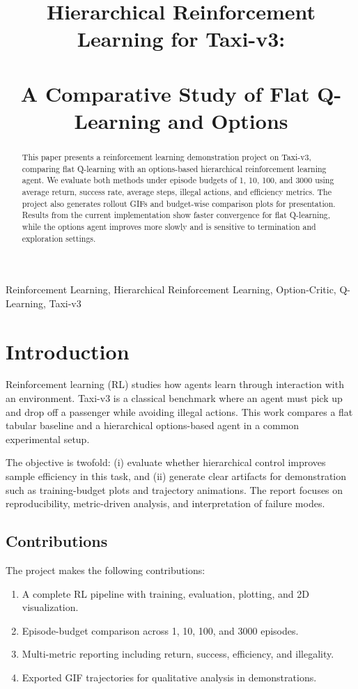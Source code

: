\documentclass[conference]{IEEEtran}
\title{Hierarchical Reinforcement Learning for Taxi-v3: \\\\ A Comparative Study of Flat Q-Learning and Options}
\author{\IEEEauthorblockN{Ravi Jangid}
\IEEEauthorblockA{Registration No.: 22MIC7020\\
Department of CSE\\
VIT-AP University}}
\begin{document}
\maketitle

\begin{abstract}
This paper presents a reinforcement learning demonstration project on Taxi-v3, comparing flat Q-learning with an options-based hierarchical reinforcement learning agent. We evaluate both methods under episode budgets of 1, 10, 100, and 3000 using average return, success rate, average steps, illegal actions, and efficiency metrics. The project also generates rollout GIFs and budget-wise comparison plots for presentation. Results from the current implementation show faster convergence for flat Q-learning, while the options agent improves more slowly and is sensitive to termination and exploration settings.
\end{abstract}

\begin{IEEEkeywords}
Reinforcement Learning, Hierarchical Reinforcement Learning, Option-Critic, Q-Learning, Taxi-v3
\end{IEEEkeywords}

\section{Introduction}
Reinforcement learning (RL) studies how agents learn through interaction with an environment. Taxi-v3 is a classical benchmark where an agent must pick up and drop off a passenger while avoiding illegal actions. This work compares a flat tabular baseline and a hierarchical options-based agent in a common experimental setup.

The objective is twofold: (i) evaluate whether hierarchical control improves sample efficiency in this task, and (ii) generate clear artifacts for demonstration such as training-budget plots and trajectory animations. The report focuses on reproducibility, metric-driven analysis, and interpretation of failure modes.

\subsection{Contributions}
The project makes the following contributions:
\begin{enumerate}
\item A complete RL pipeline with training, evaluation, plotting, and 2D visualization.
\item Episode-budget comparison across 1, 10, 100, and 3000 episodes.
\item Multi-metric reporting including return, success, efficiency, and illegality.
\item Exported GIF trajectories for qualitative analysis in demonstrations.
\end{enumerate}
\end{document}
